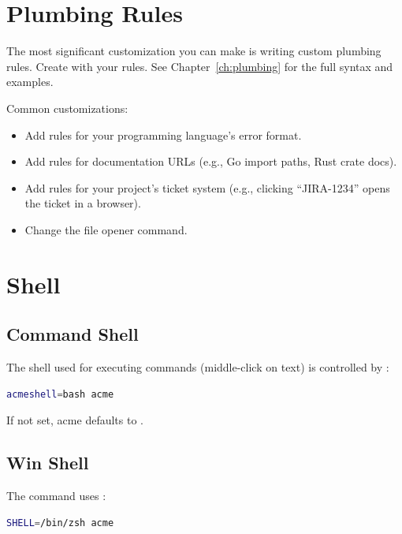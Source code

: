 \section{Plumbing Rules}
\label{sec:plumbrules}


The most significant customization you can make is writing custom
plumbing rules.  Create  with your
rules.  See Chapter~\ref{ch:plumbing} for the full syntax and examples.

Common customizations:

\begin{itemize}
\item Add rules for your programming language's error format.
\item Add rules for documentation URLs (e.g., Go import paths,
      Rust crate docs).
\item Add rules for your project's ticket system (e.g., clicking
      ``JIRA-1234'' opens the ticket in a browser).
\item Change the file opener command.
\end{itemize}

\section{Shell}
\label{sec:shellconfig}


\subsection{Command Shell}

The shell used for executing commands (middle-click on text) is
controlled by :

\begin{lstlisting}[language=bash]
acmeshell=bash acme
\end{lstlisting}

If not set, acme defaults to .

\subsection{Win Shell}

The  command uses :

\begin{lstlisting}[language=bash]
SHELL=/bin/zsh acme
\end{lstlisting}

